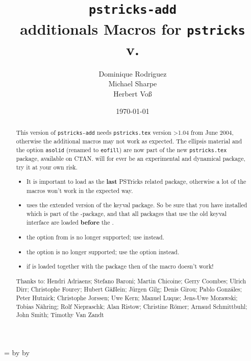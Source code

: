 \documentclass[11pt,english,BCOR10mm,DIV12,bibliography=totoc,parskip=false,smallheadings
    headexclude,footexclude,oneside]{pst-doc}
\let\pstricksaddFV\fileversion
\begin{document}
\title{\texttt{pstricks-add}\\additionals Macros for \texttt{pstricks}\\
    \small v.\pstricksaddFV}
\author{Dominique Rodriguez\\Michael Sharpe\\Herbert Vo\ss}
\date{\today}

\maketitle

\fullWidth=\linewidth
\advance\fullWidth by \marginparsep
\advance\fullWidth by \marginparwidth


\begin{abstract}
This version of \verb+pstricks-add+ needs \verb+pstricks.tex+
version >1.04 from June 2004, otherwise the additional macros may
not work as expected. The ellipsis material and the option
\verb+asolid+ (renamed to \verb+eofill+) are
 now part of the new
\verb+pstricks.tex+ package, available on CTAN.  will for ever be
an experimental and dynamical package, try it at your own risk.

\begin{itemize}
\item It is important to load  as the \textbf{last} PSTricks related package, otherwise
a lot of the macros won't work in the expected way.
\item {} uses the extended version of the keyval package. So be sure that
you have installed  which is part of the
-package, and that all packages that use the old
keyval interface are loaded \textbf{before} the
.\cite{xkeyval}
\item the option  from  is no longer supported; use  instead.
\item the option  is no longer supported; use the option  instead.
\item if  is loaded together with the package   then  
    of the  macro doesn't work!
\end{itemize}

\vfill
\noindent
Thanks to:  
Hendri Adriaens;
Stefano Baroni;
Martin Chicoine;
Gerry Coombes;
Ulrich Dirr;
Christophe Fourey;
Hubert G\"a\ss lein;
J\"urgen Gilg;
Denis Girou;
Pablo Gonzáles;
Peter Hutnick;
Christophe Jorssen;
Uwe Kern;
Manuel Luque;
Jens-Uwe Morawski;
Tobias N\"ahring;
Rolf Niepraschk;
Alan Ristow;
Christine R\"omer;
Arnaud Schmittbuhl;
John Smith;
Timothy Van Zandt
\end{abstract}
\end{document}

